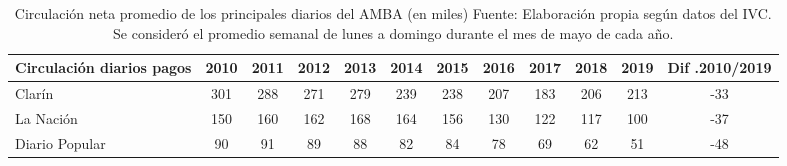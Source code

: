 \begin{table}[!ht]
\sf\footnotesize\setlength{\tabcolsep}{1pt}
\centering
\caption{Circulación neta promedio de los principales diarios del AMBA (en miles) Fuente: Elaboración propia según datos del IVC. Se consideró el promedio semanal de lunes a domingo durante el mes de mayo de cada año.}
\begin{tabular}{l | S[table=format=3.0] | S[table=format=3.0] | S[table=format=3.0] | S[table=format=3.0] | S[table=format=3.0] | S[table=format=3.0] | S[table=format=3.0] | S[table=format=3.0] | S[table=format=3.0] | S[table=format=3.0] | S[table=format=2.0] }
	\toprule
	\textbf{Circulación diarios pagos} & \textbf{2010} & \textbf{2011} & \textbf{2012} & \textbf{2013} & \textbf{2014} & \textbf{2015} & \textbf{2016} & \textbf{2017} & \textbf{2018} & \textbf{2019} & \textbf{Dif .2010/2019} \\
	\midrule
	Clarín & 301 & 288 & 271 & 279 & 239 & 238 & 207 & 183 & 206 & 213 & -33 \\
	\midrule
	La Nación & 150 & 160 & 162 & 168 & 164 & 156 & 130 & 122 & 117 & 100 & -37 \\
	\midrule
	Diario Popular & 90 & 91 & 89 & 88 & 82 & 84 & 78 & 69 & 62 & 51 & -48 \\
	\bottomrule
\end{tabular}
\end{table}

